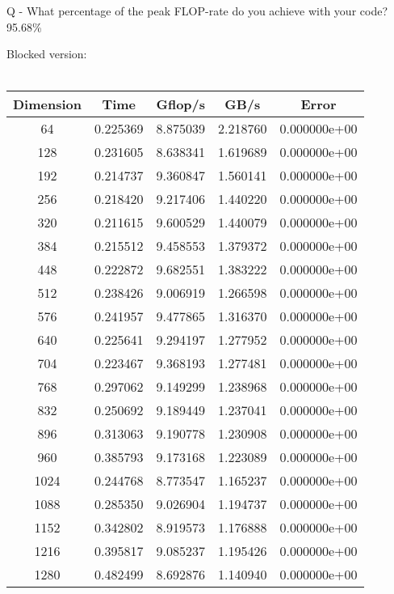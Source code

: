 \documentclass[12pt,letterpaper]{article}
\begin{document}
Q - What percentage of the peak FLOP-rate do you achieve with your code? \\
95.68\%
\newpage

Blocked version:\\\\
\begin{tabular}{ |c|c|c|c|c| } 
 \hline 
Dimension   &    Time  &  Gflop/s  &     GB/s   &       Error\\
 \hline \hline
  
        64  & 0.225369 &  8.875039 &  2.218760 & 0.000000e+00 \\
       128  & 0.231605 &  8.638341 &  1.619689 & 0.000000e+00 \\
       192  & 0.214737 &  9.360847 &  1.560141 & 0.000000e+00 \\
       256  & 0.218420 &  9.217406 &  1.440220 & 0.000000e+00 \\
       320  & 0.211615 &  9.600529 &  1.440079 & 0.000000e+00 \\
       384  & 0.215512 &  9.458553 &  1.379372 & 0.000000e+00 \\
       448  & 0.222872 &  9.682551 &  1.383222 & 0.000000e+00 \\
       512  & 0.238426 &  9.006919 &  1.266598 & 0.000000e+00 \\
       576  & 0.241957 &  9.477865 &  1.316370 & 0.000000e+00 \\
       640  & 0.225641 &  9.294197 &  1.277952 & 0.000000e+00 \\
       704  & 0.223467 &  9.368193 &  1.277481 & 0.000000e+00 \\
       768  & 0.297062 &  9.149299 &  1.238968 & 0.000000e+00 \\
       832  & 0.250692 &  9.189449 &  1.237041 & 0.000000e+00 \\
       896  & 0.313063 &  9.190778 &  1.230908 & 0.000000e+00 \\
       960  & 0.385793 &  9.173168 &  1.223089 & 0.000000e+00 \\
      1024  & 0.244768 &  8.773547 &  1.165237 & 0.000000e+00 \\
      1088  & 0.285350 &  9.026904 &  1.194737 & 0.000000e+00 \\
      1152  & 0.342802 &  8.919573 &  1.176888 & 0.000000e+00 \\
      1216  & 0.395817 &  9.085237 &  1.195426 & 0.000000e+00 \\
      1280  & 0.482499 &  8.692876 &  1.140940 & 0.000000e+00 \\

\end{tabular}
\end{document}
